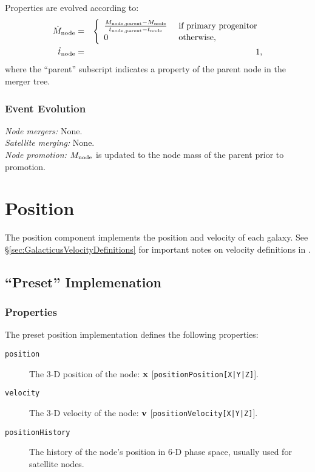 Properties are evolved according to:
\begin{eqnarray}
 \dot{M}_{\rm node} &=& \left\{\begin{array}{ll}{M_{\rm node, parent} - M_{\rm node} \over t_{\rm node, parent} - t_{\rm node}} & \hbox{ if primary progenitor} \\ 0 & \hbox{ otherwise}, \end{array} \right. \\
 \dot{t}_{\rm node} &=& 1,
\end{eqnarray}
where the ``parent'' subscript indicates a property of the parent \gls{node} in the merger tree.

\subsubsection{Event Evolution}

\noindent\emph{Node mergers:} None.\\

\noindent\emph{Satellite merging:} None.\\

\noindent\emph{Node promotion:} $M_{\rm node}$ is updated to the \gls{node} mass of the parent prior to promotion.\\


\section{Position}\label{sec:ComponentPosition}

The position \gls{component} implements the position and velocity of each galaxy. See \S\ref{sec:GalacticusVelocityDefinitions} for important notes on velocity definitions in \glc.

\subsection{``Preset'' Implemenation}

\subsubsection{Properties}

The preset position implementation defines the following properties:
\begin{description}
 \item [{\tt position}] The 3-D position of the node: ${\bf x}$ [{\tt positionPosition[X|Y|Z]}].
 \item [{\tt velocity}] The 3-D velocity of the node: ${\bf v}$ [{\tt positionVelocity[X|Y|Z]}].
 \item [{\tt positionHistory}] The history of the node's position in 6-D phase space, usually used for satellite nodes.
\end{description}

